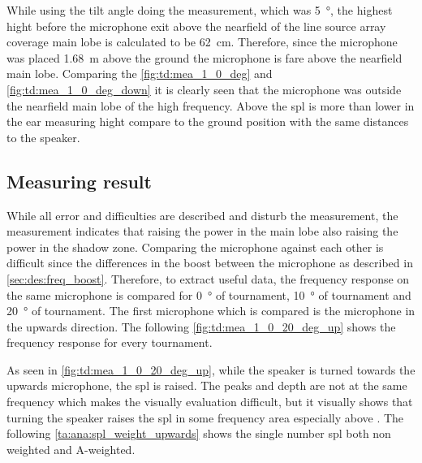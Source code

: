 

While using the tilt angle doing the measurement, which was \SI{5}{\degree}, the highest hight before the microphone exit above the nearfield of the line source array coverage main lobe is calculated to be \SI{62}{\centi\meter}. Therefore, since the microphone was placed \SI{1.68}{\meter} above the ground the microphone is fare above the nearfield main lobe. Comparing the \autoref{fig:td:mea_1_0_deg} and \autoref{fig:td:mea_1_0_deg_down} it is clearly seen that the microphone was outside the nearfield main lobe of the high frequency. Above  the \gls{spl} is more than  lower in the ear measuring hight compare to the ground position with the same distances to the speaker. 

\subsection{Measuring result}\label{sec:des:measuring_result}
While all error and difficulties are described and disturb the measurement, the measurement indicates that raising the power in the main lobe also raising the power in the shadow zone. Comparing the microphone against each other is difficult since the differences in the boost between the microphone as described in \autoref{sec:des:freq_boost}. Therefore, to extract useful data, the frequency response on the same microphone is compared for \SI{0}{\degree} of tournament, \SI{10}{\degree} of tournament and \SI{20}{\degree} of tournament.   
The first microphone which is compared is the microphone in the upwards direction. The following \autoref{fig:td:mea_1_0_20_deg_up} shows the frequency response for every tournament.


As seen in \autoref{fig:td:mea_1_0_20_deg_up}, while the speaker is turned towards the upwards microphone, the \gls{spl} is raised. The peaks and depth are not at the same frequency which makes the visually evaluation difficult, but it visually shows that turning the speaker raises the \gls{spl} in some frequency area especially above . The following \autoref{ta:ana:spl_weight_upwards} shows the single number \gls{spl} both non weighted and A-weighted.


